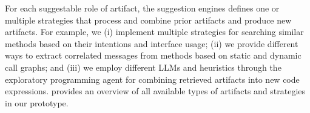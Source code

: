 For each suggestable role of artifact, the suggestion engines defines one or multiple strategies that process and combine prior artifacts and produce new artifacts.
For example, we (i) implement multiple strategies for searching similar methods based on their intentions and interface usage; (ii) we provide different ways to extract correlated messages from methods based on static and dynamic call graphs; and (iii) we employ different LLMs and heuristics through the exploratory programming agent for combining retrieved artifacts into new code expressions.
 provides an overview of all available types of artifacts and strategies in our prototype.
